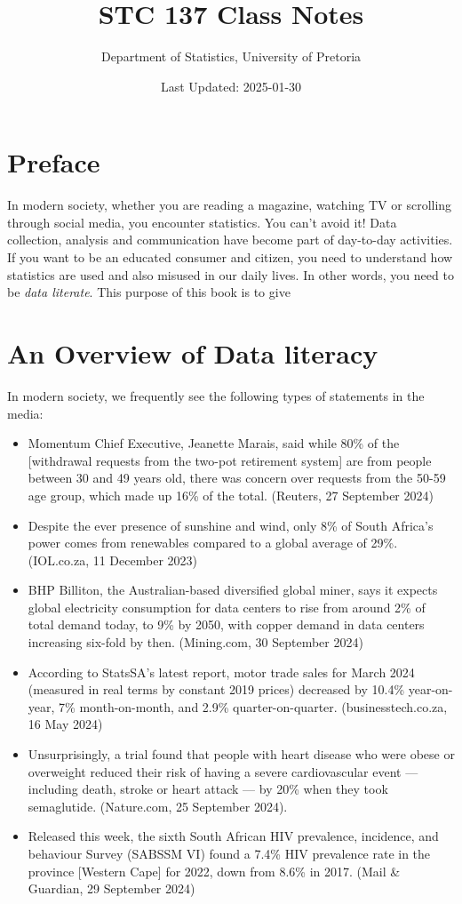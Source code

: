 \documentclass[
]{book}
\title{STC 137 Class Notes}
\author{Department of Statistics, University of Pretoria}
\date{Last Updated: 2025-01-30}
\begin{document}
\maketitle

{
\setcounter{tocdepth}{2}
\tableofcontents
}
\chapter*{Preface}\label{preface}

In modern society, whether you are reading a magazine, watching TV or scrolling through social media, you encounter statistics. You can't avoid it! Data collection, analysis and communication have become part of day-to-day activities. If you want to be an educated consumer and citizen, you need to understand how statistics are used and also misused in our daily lives. In other words, you need to be \emph{data literate}. This purpose of this book is to give

\chapter{An Overview of Data literacy}\label{an-overview-of-data-literacy}

In modern society, we frequently see the following types of statements in the media:

\begin{itemize}
\item
  Momentum Chief Executive, Jeanette Marais, said while 80\% of the {[}withdrawal requests from the two-pot retirement system{]} are from people between 30 and 49 years old, there was concern over requests from the 50-59 age group, which made up 16\% of the total. (Reuters, 27 September 2024)
\item
  Despite the ever presence of sunshine and wind, only 8\% of South Africa's power comes from renewables compared to a global average of 29\%. (IOL.co.za, 11 December 2023)
\item
  BHP Billiton, the Australian-based diversified global miner, says it expects global electricity consumption for data centers to rise from around 2\% of total demand today, to 9\% by 2050, with copper demand in data centers increasing six-fold by then. (Mining.com, 30 September 2024)
\item
  According to StatsSA's latest report, motor trade sales for March 2024 (measured in real terms by constant 2019 prices) decreased by 10.4\% year-on-year, 7\% month-on-month, and 2.9\% quarter-on-quarter. (businesstech.co.za, 16 May 2024)
\item
  Unsurprisingly, a trial found that people with heart disease who were obese or overweight reduced their risk of having a severe cardiovascular event --- including death, stroke or heart attack --- by 20\% when they took semaglutide. (Nature.com, 25 September 2024).
\item
  Released this week, the sixth South African HIV prevalence, incidence, and behaviour Survey (SABSSM VI) found a 7.4\% HIV prevalence rate in the province {[}Western Cape{]} for 2022, down from 8.6\% in 2017. (Mail \& Guardian, 29 September 2024)
\end{itemize}
\end{document}
